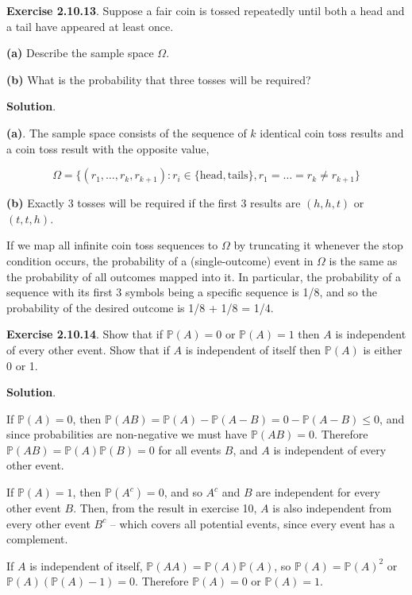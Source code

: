 \textbf{Exercise 2.10.13}. Suppose a fair coin is tossed repeatedly
until both a head and a tail have appeared at least once.

\textbf{(a)} Describe the sample space \(\Omega\).

\textbf{(b)} What is the probability that three tosses will be required?

\textbf{Solution}.

\textbf{(a)}. The sample space consists of the sequence of \(k\)
identical coin toss results and a coin toss result with the opposite
value,

\[ \Omega = \{ (r_1, \dots, r_k, r_{k+1}) : r_i \in \{ \text{head}, \text{tails} \}, r_1 = \dots = r_k \neq r_{k + 1} \} \]

\textbf{(b)} Exactly 3 tosses will be required if the first 3 results
are \((h, h, t)\) or \((t, t, h)\).

If we map all infinite coin toss sequences to \(\Omega\) by truncating
it whenever the stop condition occurs, the probability of a
(single-outcome) event in \(\Omega\) is the same as the probability of
all outcomes mapped into it. In particular, the probability of a
sequence with its first 3 symbols being a specific sequence is 1/8, and
so the probability of the desired outcome is 1/8 + 1/8 = 1/4.

\textbf{Exercise 2.10.14}. Show that if \(\mathbb{P}(A) = 0\) or
\(\mathbb{P}(A) = 1\) then \(A\) is independent of every other event.
Show that if \(A\) is independent of itself then \(\mathbb{P}(A)\) is
either 0 or 1.

\textbf{Solution}.

If \(\mathbb{P}(A) = 0\), then
\(\mathbb{P}(AB) = \mathbb{P}(A) - \mathbb{P}(A - B) = 0 -\mathbb{P}(A - B) \leq 0\),
and since probabilities are non-negative we must have
\(\mathbb{P}(AB) = 0\). Therefore
\(\mathbb{P}(AB) = \mathbb{P}(A) \mathbb{P}(B) = 0\) for all events
\(B\), and \(A\) is independent of every other event.

If \(\mathbb{P}(A) = 1\), then \(\mathbb{P}(A^c) = 0\), and so \(A^c\)
and \(B\) are independent for every other event \(B\). Then, from the
result in exercise 10, \(A\) is also independent from every other event
\(B^c\) -- which covers all potential events, since every event has a
complement.

If \(A\) is independent of itself,
\(\mathbb{P}(AA) = \mathbb{P}(A) \mathbb{P}(A)\), so
\(\mathbb{P}(A) = \mathbb{P}(A)^2\) or
\(\mathbb{P}(A) ( \mathbb{P}(A) - 1 ) = 0\). Therefore
\(\mathbb{P}(A) = 0\) or \(\mathbb{P}(A) = 1\).

